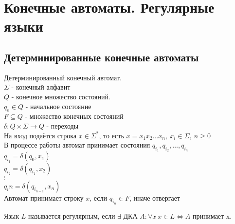 \section {Конечные автоматы. Регулярные языки}
\subsection{Детерминированные конечные автоматы}
\begin{conj}
    Детерминированный конечный автомат.\\
    $\Sigma$ - конечный алфавит\\
    $Q$ - конечное множество состояний.\\
    $q_o \in Q$ - начальное состояние\\
    $F \subseteq Q$ - множество конечных состояний\\
    $\delta : Q \times \Sigma \to Q$ - переходы\\
    На вход подаётся строка $x \in \Sigma^*$, то есть $x = x_1x_2\dots x_n,\ x_i \in \Sigma,\ n \geq 0$\\
    В процессе работы автомат принимает состояния $q_{i_1}, q_{i_2}, \dots, q_{i_n}$\\
    $q_{i_1} = \delta(q_0, x_1)$\\
    $q_{i_2} = \delta(q_{i_1}, x_2)$\\
    $\vdots$\\
    $q_i{n} = \delta(q_{i_{n-1}}, x_n)$\\
    Автомат принимает строку $x$, если $q_{i_n} \in F$, иначе отвергает
\end{conj}

\begin{conj}
    Язык $L$ называется регулярным, если $\exists$ ДКА $A : \forall x\ x \in L \Leftrightarrow A$ принимает x.
\end{conj}

